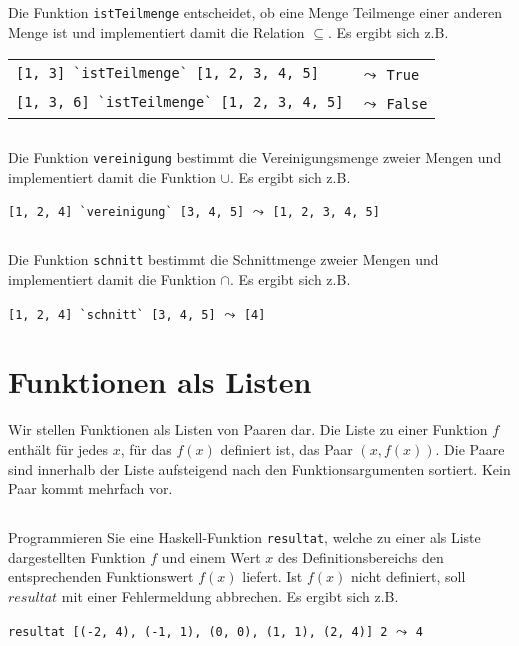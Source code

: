 \documentclass[
  10pt,                   %
  DIV12,
  german,                 %
  oneside,                %
  parskip=half,           %
  headings=normal,        %
  captions=tableheading,  %
]{scrartcl}
\begin{document}
\subsection{}
Die Funktion \lstinline|istTeilmenge| entscheidet, ob eine Menge Teilmenge einer anderen Menge ist und implementiert damit die Relation $\subseteq$. Es ergibt sich z.B.
\begin{center}
\begin{tabular}{ll}
\lstinline|[1, 3] `istTeilmenge` [1, 2, 3, 4, 5]| & $\leadsto$ \lstinline|True|\\
\lstinline|[1, 3, 6] `istTeilmenge` [1, 2, 3, 4, 5]| & $\leadsto$ \lstinline|False|
\end{tabular}
\end{center}
\subsection{}
Die Funktion \lstinline|vereinigung| bestimmt die Vereinigungsmenge zweier Mengen und
implementiert damit die Funktion $\cup$. Es ergibt sich z.B.
\begin{center}
\lstinline|[1, 2, 4] `vereinigung` [3, 4, 5]|  $\leadsto$ \lstinline|[1, 2, 3, 4, 5]|
\end{center}
\subsection{}
Die Funktion \lstinline|schnitt| bestimmt die Schnittmenge zweier Mengen und implementiert
damit die Funktion $\cap$. Es ergibt sich z.B.
\begin{center}
\lstinline|[1, 2, 4] `schnitt` [3, 4, 5]| $\leadsto$ \lstinline|[4]|
\end{center}
\section{Funktionen als Listen}
Wir stellen Funktionen als Listen von Paaren dar. Die Liste zu einer Funktion $f$ enthält
für jedes $x$, für das $f (x)$ definiert ist, das Paar $(x, f(x))$. Die Paare sind innerhalb der Liste
aufsteigend nach den Funktionsargumenten sortiert. Kein Paar kommt mehrfach vor.
\subsection{}
Programmieren Sie eine Haskell-Funktion \lstinline|resultat|, welche zu
einer als Liste dargestellten Funktion $f$ und einem Wert $x$ des Definitionsbereichs
den entsprechenden Funktionswert $f(x)$ liefert. Ist $f(x)$ nicht definiert, soll $resultat$
mit einer Fehlermeldung abbrechen. Es ergibt sich z.B.
\begin{center}
\lstinline|resultat [(-2, 4), (-1, 1), (0, 0), (1, 1), (2, 4)] 2| $\leadsto$ \lstinline|4|
\end{center}
\end{document}
